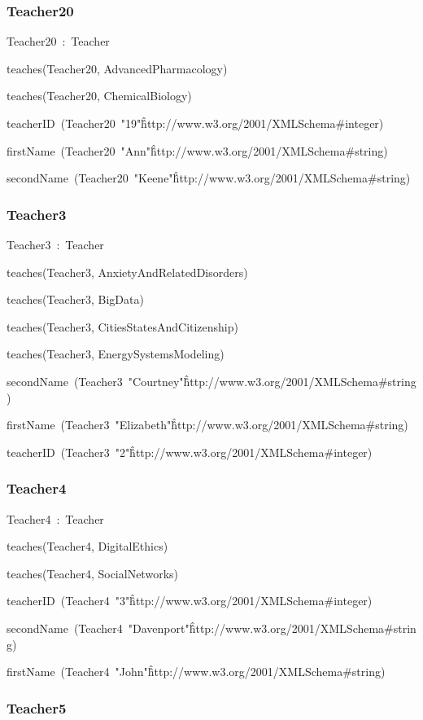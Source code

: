 \documentclass{article}
\begin{document}
\subsubsection*{Teacher20}

Teacher20~:~Teacher

teaches(Teacher20, AdvancedPharmacology)

teaches(Teacher20, ChemicalBiology)

teacherID~(Teacher20~"19"\^\^http://www.w3.org/2001/XMLSchema#integer)

firstName~(Teacher20~"Ann"\^\^http://www.w3.org/2001/XMLSchema#string)

secondName~(Teacher20~"Keene"\^\^http://www.w3.org/2001/XMLSchema#string)

\subsubsection*{Teacher3}

Teacher3~:~Teacher

teaches(Teacher3, AnxietyAndRelatedDisorders)

teaches(Teacher3, BigData)

teaches(Teacher3, CitiesStatesAndCitizenship)

teaches(Teacher3, EnergySystemsModeling)

secondName~(Teacher3~"Courtney"\^\^http://www.w3.org/2001/XMLSchema#string)

firstName~(Teacher3~"Elizabeth"\^\^http://www.w3.org/2001/XMLSchema#string)

teacherID~(Teacher3~"2"\^\^http://www.w3.org/2001/XMLSchema#integer)

\subsubsection*{Teacher4}

Teacher4~:~Teacher

teaches(Teacher4, DigitalEthics)

teaches(Teacher4, SocialNetworks)

teacherID~(Teacher4~"3"\^\^http://www.w3.org/2001/XMLSchema#integer)

secondName~(Teacher4~"Davenport"\^\^http://www.w3.org/2001/XMLSchema#string)

firstName~(Teacher4~"John"\^\^http://www.w3.org/2001/XMLSchema#string)

\subsubsection*{Teacher5}
\end{document}
